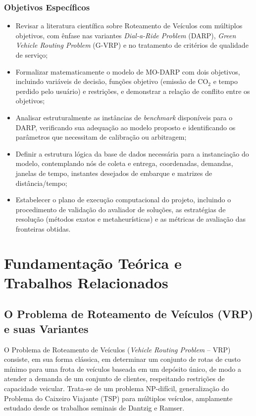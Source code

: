 \documentclass[12pt,a4paper]{article}
\theoremstyle{plain}
\begin{document}
\subsubsection{Objetivos Específicos}

\begin{itemize}
    \item Revisar a literatura científica sobre Roteamento de Veículos com múltiplos objetivos, com ênfase nas variantes \textit{Dial-a-Ride Problem} (DARP), \textit{Green Vehicle Routing Problem} (G-VRP) e no tratamento de critérios de qualidade de serviço;
    \item Formalizar matematicamente o modelo de MO-DARP com dois objetivos, incluindo variáveis de decisão, funções objetivo (emissão de $\text{CO}_2$ e tempo perdido pelo usuário) e restrições, e demonstrar a relação de conflito entre os objetivos;
    \item Analisar estruturalmente as instâncias de \textit{benchmark} disponíveis para o DARP, verificando sua adequação ao modelo proposto e identificando os parâmetros que necessitam de calibração ou arbitragem;
    \item Definir a estrutura lógica da base de dados necessária para a instanciação do modelo, contemplando nós de coleta e entrega, coordenadas, demandas, janelas de tempo, instantes desejados de embarque e matrizes de distância/tempo;
    \item Estabelecer o plano de execução computacional do projeto, incluindo o procedimento de validação do avaliador de soluções, as estratégias de resolução (métodos exatos e metaheurísticas) e as métricas de avaliação das fronteiras obtidas.
\end{itemize}

\section{Fundamentação Teórica e Trabalhos Relacionados}

\subsection{O Problema de Roteamento de Veículos (VRP) e suas Variantes}

O Problema de Roteamento de Veículos (\textit{Vehicle Routing Problem} -- VRP) consiste, em sua forma clássica, em determinar um conjunto de rotas de custo mínimo para uma frota de veículos baseada em um depósito único, de modo a atender a demanda de um conjunto de clientes, respeitando restrições de capacidade veicular. Trata-se de um problema NP-difícil, generalização do Problema do Caixeiro Viajante (TSP) para múltiplos veículos, amplamente estudado desde os trabalhos seminais de Dantzig e Ramser.
\end{document}
